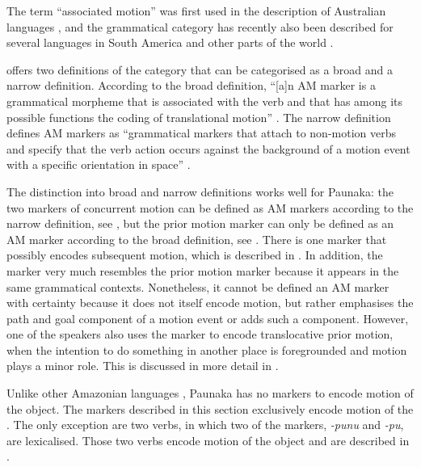 
The term “associated motion” was first used in the description of Australian languages \citep[cf.][]{Koch1984,Wilkins1991}, and the grammatical category has recently also been described for several languages in South America \citep[e.g.][]{Guillaume2000,Guillaume2013,Guillaume2016,Fabre2013,Vuillermet2013,Rose2015} and other parts of the world \citep[e.g.][]{OConnor2007,Jacques2013}.

\citet[]{Guillaume2013,Guillaume2016} offers two definitions of the category that can be categorised as a broad and a narrow definition. According to the broad definition, “[a]n AM marker is a grammatical morpheme that is associated with the verb and that has among its possible functions the coding of translational motion” \citep[92]{Guillaume2016}. The narrow definition defines AM markers as “grammatical markers that attach to non-motion verbs and specify that the verb action occurs against the background of a motion event with a specific orientation in space” \citep[131]{Guillaume2013}.

The distinction into broad and narrow definitions works well for Paunaka: the two markers of concurrent motion can be defined as AM markers according to the narrow definition, see , but the prior motion marker can only be defined as an AM marker according to the broad definition, see . There is one marker that possibly encodes subsequent motion, which is described in . In addition, the  marker very much resembles the prior motion marker because it appears in the same grammatical contexts. Nonetheless, it cannot be defined an AM marker with certainty because it does not itself encode motion, but rather emphasises the path and goal component of a motion event or adds such a component. However, one of the speakers also uses the marker to encode translocative prior motion, when the intention to do something in another place is foregrounded and motion plays a minor role. This is discussed in more detail in .

Unlike other Amazonian languages \citep[cf.][]{Guillaume2016}, Paunaka has no markers to encode motion of the object. The markers described in this section exclusively encode motion of the . The only exception are two verbs, in which two of the markers, \textit{-punu} and \textit{-pu}, are lexicalised. Those two verbs encode motion of the object and are described in .

